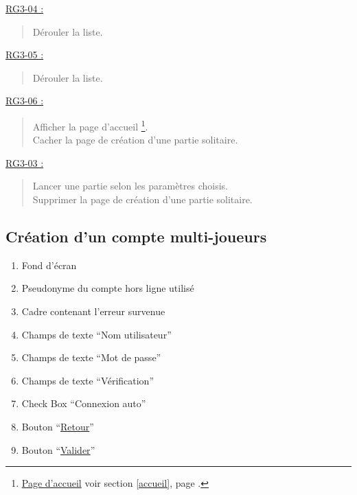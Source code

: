 \documentclass{report}
\begin{document}
			\underline{RG3-04 :}
				\begin{quote}
					Dérouler la liste.\\				
				\end{quote}	
				

			\underline{RG3-05 :}
				\begin{quote}
					Dérouler la liste.\\				
				\end{quote}	


			\underline{RG3-06 :}
				\begin{quote}
					Afficher la page d'accueil%
						\footnote[1]{
							\hyperlink{Page d'accueil}{Page d'accueil}
							\og voir section \ref{accueil}, page \pageref{accueil}.\fg
						}.\\
					Cacher la page de création d'une partie solitaire.\\
				\end{quote}


			\underline{RG3-03 :}
				\begin{quote}
					 Lancer une partie selon les paramètres choisis.\\
					 Supprimer la page de création d'une partie solitaire.\\
				\end{quote}	


\newpage

	\subsection{Création d'un compte multi-joueurs}
	
		\hypertarget{Creation compte multi-joueurs}{}
		\label{Creation compte multi-joueurs}
	
		\begin{center}
			
		\end{center}
		
		\begin{enumerate}
		  \item Fond d'écran
		  \item Pseudonyme du compte hors ligne utilisé
		  \item Cadre contenant l'erreur survenue
		  \item Champs de texte ``Nom utilisateur''
		  \item Champs de texte ``Mot de passe''
		  \item Champs de texte ``Vérification''
		  \item Check Box ``Connexion auto''
		  \item Bouton ``\hyperlink{Connexion multi-joueurs}{Retour}''
		  \item Bouton ``\hyperlink{Accueil multi-joueurs}{Valider}''
		\end{enumerate}
		
\end{document}
